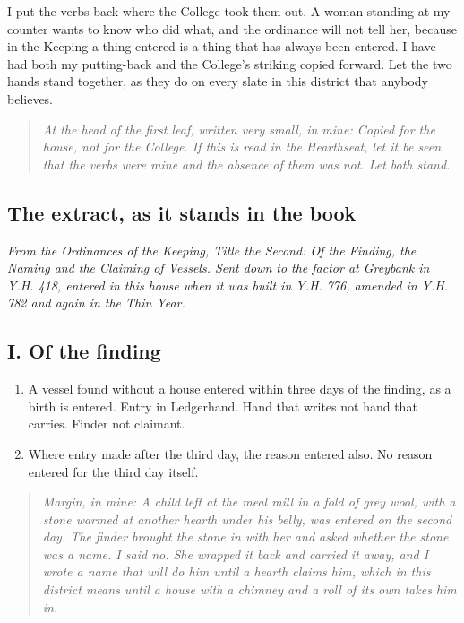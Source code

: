 \documentclass{design/chronicle}
\begin{document}
I put the verbs back where the College took them out. A woman standing at my counter wants to know who did what, and the ordinance will not tell her, because in the Keeping a thing entered is a thing that has always been entered. I have had both my putting-back and the College’s striking copied forward. Let the two hands stand together, as they do on every slate in this district that anybody believes.

\begin{quote}\itshape \emph{At the head of the first leaf, written very small, in mine:} Copied for the house, not for the College. If this is read in the Hearthseat, let it be seen that the verbs were mine and the absence of them was not. Let both stand.\end{quote}

\subsection*{The extract, as it stands in the book}

\emph{From the Ordinances of the Keeping, Title the Second: Of the Finding, the Naming and the Claiming of Vessels. Sent down to the factor at Greybank in Y.H. 418, entered in this house when it was built in Y.H. 776, amended in Y.H. 782 and again in the Thin Year.}

\subsection*{I. Of the finding}

\begin{enumerate}[leftmargin=1.4em,itemsep=1pt,topsep=3pt,parsep=0pt]

\item A vessel found without a house entered within three days of the finding, as a birth is entered. Entry in Ledgerhand. Hand that writes not hand that carries. Finder not claimant.

\item Where entry made after the third day, the reason entered also. No reason entered for the third day itself.

\end{enumerate}

\begin{quote}\itshape \emph{Margin, in mine:} A child left at the meal mill in a fold of grey wool, with a stone warmed at another hearth under his belly, was entered on the second day. The finder brought the stone in with her and asked whether the stone was a name. I said no. She wrapped it back and carried it away, and I wrote a name that will do him until a hearth claims him, which in this district means until a house with a chimney and a roll of its own takes him in.\end{quote}
\end{document}
